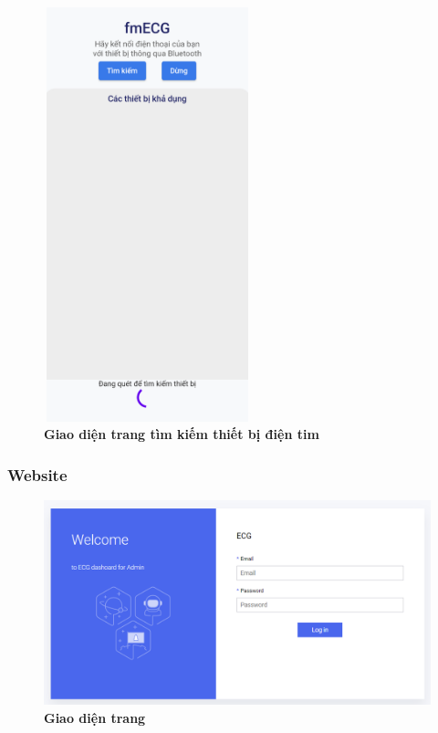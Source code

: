 \begin{figure}[H]
  \centering
  \includegraphics[width=6cm,height=12cm]{Images/mobile_app/demo/finding_bluetooth.png}
  \caption[Giao diện trang tìm kiếm thiết bị điện tim]{\bfseries \fontsize{12pt}{0pt}\selectfont Giao diện trang tìm kiếm thiết bị điện tim}
  \label{demo_} %
\end{figure}
\subsubsection{Website}




\begin{figure}[H]
  \centering
  \includegraphics[scale=0.7]{Images/server/webUI/login.PNG}
  \caption[Giao diện trang]{\bfseries \fontsize{12pt}{0pt}\selectfont Giao diện trang}
  \label{demo_} %
\end{figure}

